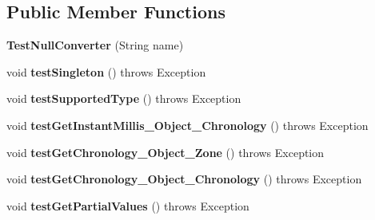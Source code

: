 \subsection*{Public Member Functions}
\begin{DoxyCompactItemize}
\item 
\hypertarget{classorg_1_1joda_1_1time_1_1convert_1_1_test_null_converter_ae4d32e6f6ef4b65bf9445fdc762038eb}{{\bfseries Test\-Null\-Converter} (String name)}\label{classorg_1_1joda_1_1time_1_1convert_1_1_test_null_converter_ae4d32e6f6ef4b65bf9445fdc762038eb}

\item 
\hypertarget{classorg_1_1joda_1_1time_1_1convert_1_1_test_null_converter_a40f54b40884375f1b33084cb9258b044}{void {\bfseries test\-Singleton} ()  throws Exception }\label{classorg_1_1joda_1_1time_1_1convert_1_1_test_null_converter_a40f54b40884375f1b33084cb9258b044}

\item 
\hypertarget{classorg_1_1joda_1_1time_1_1convert_1_1_test_null_converter_a135a6bd23d0cc58b83a90e9fa5b1e168}{void {\bfseries test\-Supported\-Type} ()  throws Exception }\label{classorg_1_1joda_1_1time_1_1convert_1_1_test_null_converter_a135a6bd23d0cc58b83a90e9fa5b1e168}

\item 
\hypertarget{classorg_1_1joda_1_1time_1_1convert_1_1_test_null_converter_a55dd0ba670de3e854a5928e6fa9c2244}{void {\bfseries test\-Get\-Instant\-Millis\-\_\-\-Object\-\_\-\-Chronology} ()  throws Exception }\label{classorg_1_1joda_1_1time_1_1convert_1_1_test_null_converter_a55dd0ba670de3e854a5928e6fa9c2244}

\item 
\hypertarget{classorg_1_1joda_1_1time_1_1convert_1_1_test_null_converter_a7af9ec6e280334b73a5c6749d5ed257d}{void {\bfseries test\-Get\-Chronology\-\_\-\-Object\-\_\-\-Zone} ()  throws Exception }\label{classorg_1_1joda_1_1time_1_1convert_1_1_test_null_converter_a7af9ec6e280334b73a5c6749d5ed257d}

\item 
\hypertarget{classorg_1_1joda_1_1time_1_1convert_1_1_test_null_converter_a6ff77c213c17fa0345b8dec59fa0745e}{void {\bfseries test\-Get\-Chronology\-\_\-\-Object\-\_\-\-Chronology} ()  throws Exception }\label{classorg_1_1joda_1_1time_1_1convert_1_1_test_null_converter_a6ff77c213c17fa0345b8dec59fa0745e}

\item 
\hypertarget{classorg_1_1joda_1_1time_1_1convert_1_1_test_null_converter_ae3218bccc406007aeafce6917bbf8705}{void {\bfseries test\-Get\-Partial\-Values} ()  throws Exception }\label{classorg_1_1joda_1_1time_1_1convert_1_1_test_null_converter_ae3218bccc406007aeafce6917bbf8705}


\end{DoxyCompactItemize}

